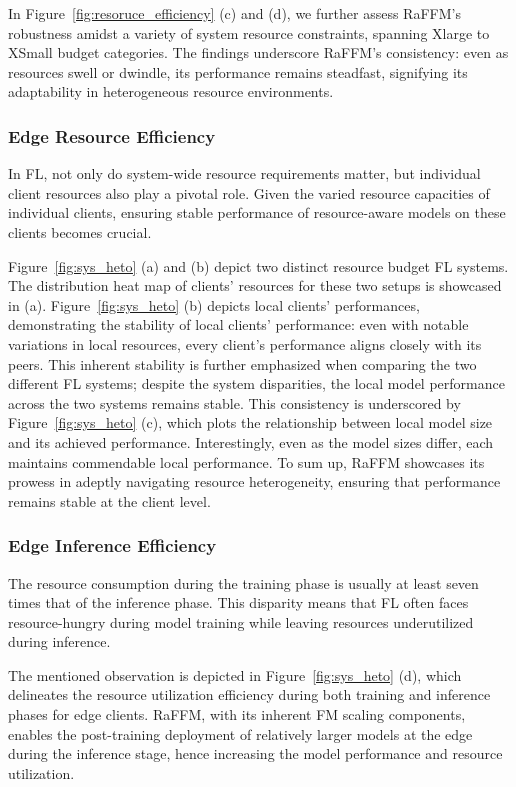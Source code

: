 In Figure~\ref{fig:resoruce_efficiency} (c) and (d), we further assess RaFFM's robustness amidst a variety of system resource constraints, spanning Xlarge to XSmall budget categories. The findings underscore RaFFM's consistency: even as resources swell or dwindle, its performance remains steadfast, signifying its adaptability in heterogeneous resource environments.



\subsubsection{Edge Resource Efficiency}

In FL, not only do system-wide resource requirements matter, but individual client resources also play a pivotal role. Given the varied resource capacities of individual clients, ensuring stable performance of resource-aware models on these clients becomes crucial. 

Figure~\ref{fig:sys_heto} (a) and (b) depict two distinct resource budget FL systems. The distribution heat map of clients' resources for these two setups is showcased in (a). Figure~\ref{fig:sys_heto} (b) depicts local clients' performances, demonstrating the stability of local clients' performance: even with notable variations in local resources, every client's performance aligns closely with its peers. This inherent stability is further emphasized when comparing the two different FL systems; despite the system disparities, the local model performance across the two systems remains stable.
This consistency is underscored by Figure~\ref{fig:sys_heto} (c), which plots the relationship between local model size and its achieved performance. Interestingly, even as the model sizes differ, each maintains commendable local performance.
To sum up, RaFFM showcases its prowess in adeptly navigating resource heterogeneity, ensuring that performance remains stable at the client level.

\subsubsection{Edge Inference Efficiency}
\label{subsec:edge_inference_efficiency}
The resource consumption during the training phase is usually at least seven times that of the inference phase. 
This disparity means that FL often faces resource-hungry during model training while leaving resources underutilized during inference.

The mentioned observation is depicted in Figure~\ref{fig:sys_heto} (d), which delineates the resource utilization efficiency during both training and inference phases for edge clients. 
RaFFM, with its inherent FM scaling components, 
enables the post-training deployment of relatively larger models at the edge during the inference stage, hence increasing the model performance and resource utilization.



